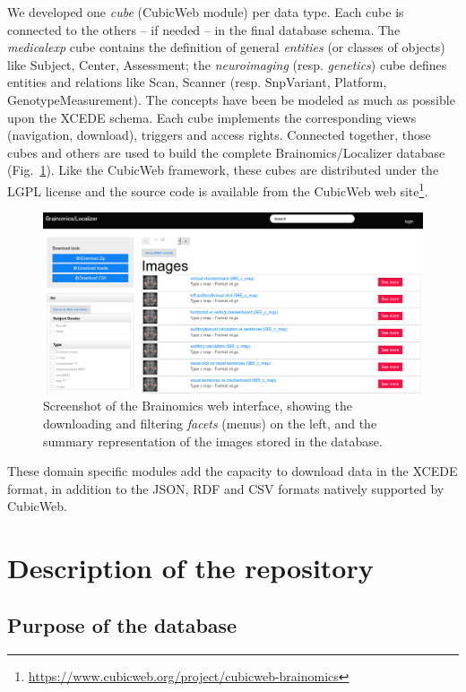 \documentclass[preprint,12pt]{elsarticle}
\begin{document}
We developed one \textit{cube} (CubicWeb module) per data type. Each cube is connected to the others -- if needed -- in the final database schema. The \textit{medicalexp} cube contains the definition of general \textit{entities} (or classes of objects) like Subject, Center, Assessment; the \textit{neuroimaging} (resp. \textit{genetics}) cube defines entities and relations like Scan, Scanner (resp. SnpVariant, Platform, GenotypeMeasurement). The concepts have been be modeled as much as possible upon the XCEDE \cite{keator2006general} schema. Each cube implements the corresponding views (navigation, download), triggers and access rights. Connected together, those cubes and others are used to build the complete Brainomics/Localizer database (Fig.~\ref{fig:ui}). Like the CubicWeb framework, these cubes are distributed under the LGPL license and the source code is available from the CubicWeb web site\footnote{\url{https://www.cubicweb.org/project/cubicweb-brainomics}}.

\begin{figure}[ht!]
    \includegraphics[width=\textwidth]{ui1}
    \caption{Screenshot of the Brainomics web interface, showing the downloading and filtering \emph{facets} (menus) on the left, and the summary representation of the images stored in the database.}
    \label{fig:ui}
\end{figure}

These domain specific modules add the capacity to download data in the XCEDE \cite{keator2006general} format, in addition to the JSON, RDF and CSV formats natively supported by CubicWeb.


\section{Description of the repository}

\subsection{Purpose of the database}
\end{document}
